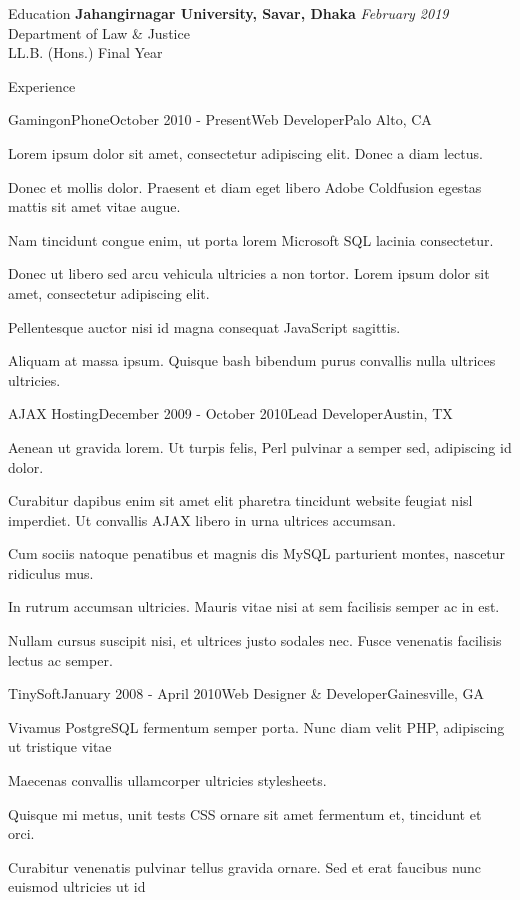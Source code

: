 \documentclass{resume}
\begin{document}
  \begin{rSection}{Education}
    {\bf Jahangirnagar University, Savar, Dhaka} \hfill {\em February 2019} \\ 
    { Department of Law \& Justice } \\
    LL.B. (Hons.) Final Year
  \end{rSection}
  
  \begin{rSection}{Experience}
  
    \begin{rSubsection}{GamingonPhone}{October 2010 - Present}{Web Developer}{Palo Alto, CA}
    \item Lorem ipsum dolor sit amet, consectetur adipiscing elit. Donec a diam lectus.
    \item Donec et mollis dolor. Praesent et diam eget libero Adobe Coldfusion egestas mattis sit amet vitae augue.
    \item Nam tincidunt congue enim, ut porta lorem Microsoft SQL lacinia consectetur.
    \item Donec ut libero sed arcu vehicula ultricies a non tortor. Lorem ipsum dolor sit amet, consectetur adipiscing elit.
    \item Pellentesque auctor nisi id magna consequat JavaScript sagittis.
    \item Aliquam at massa ipsum. Quisque bash bibendum purus convallis nulla ultrices ultricies.
    \end{rSubsection}
  
    \begin{rSubsection}{AJAX Hosting}{December 2009 - October 2010}{Lead Developer}{Austin, TX}
    \item Aenean ut gravida lorem. Ut turpis felis, Perl pulvinar a semper sed, adipiscing id dolor.
    \item Curabitur dapibus enim sit amet elit pharetra tincidunt website feugiat nisl imperdiet. Ut convallis AJAX libero in urna ultrices accumsan.
    \item Cum sociis natoque penatibus et magnis dis MySQL parturient montes, nascetur ridiculus mus.
    \item In rutrum accumsan ultricies. Mauris vitae nisi at sem facilisis semper ac in est.
    \item Nullam cursus suscipit nisi, et ultrices justo sodales nec. Fusce venenatis facilisis lectus ac semper.
    \end{rSubsection}

    \begin{rSubsection}{TinySoft}{January 2008 - April 2010}{Web Designer \& Developer}{Gainesville, GA}
    \item Vivamus PostgreSQL fermentum semper porta. Nunc diam velit PHP, adipiscing ut tristique vitae
    \item Maecenas convallis ullamcorper ultricies stylesheets.
    \item Quisque mi metus, unit tests CSS ornare sit amet fermentum et, tincidunt et orci.
    \item Curabitur venenatis pulvinar tellus gravida ornare. Sed et erat faucibus nunc euismod ultricies ut id
    \end{rSubsection}
  

\end{rSection}
\end{document}
